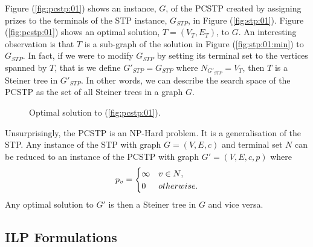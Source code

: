 Figure (\ref{fig:pcstp:01}) shows an instance, $G$, of the PCSTP created by assigning prizes to the terminals of the STP instance, $G_{STP}$, in Figure (\ref{fig:stp:01}).
Figure (\ref{fig:pcstp:01})
shows an optimal solution, $T = (V_T, E_T)$, to $G$. An interesting observation is that
$T$ is a sub-graph of the solution in Figure (\ref{fig:stp:01:min}) to $G_{STP}$.
In fact, if we were to modify $G_{STP}$ by setting its terminal set to the vertices spanned
by $T$, that is we define $G'_{STP} =  G_{STP}$ where  $N_{G'_{STP}} = V_T$, then $T$ is a Steiner
tree in $G'_{STP}$. In other words, we can describe the search space of the PCSTP
 as the set of all Steiner trees in a graph $G$.

\begin{figure}[h]\centering
{}
\caption{Optimal solution to (\ref{fig:pcstp:01})\textnormal{.}}
\label{fig:pcstp:01:opt}
\end{figure}

Unsurprisingly, the PCSTP is an NP-Hard problem. It is a generalisation of the STP. Any instance of
the STP with graph $G = (V, E, c)$ and terminal set $N$ can be reduced to an instance of the PCSTP
with graph $G' = (V, E, c, p)$ where
$$p_v =
\begin{cases}
  \infty & v \in N\mathnormal{,} \\
  0 & \mathnormal{otherwise.}
\end{cases}$$
Any optimal solution to $G'$ is then a Steiner tree in $G$ and vice versa.
\subsection{ILP Formulations}
